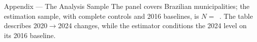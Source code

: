 
\begin{frame}{Appendix --- The Analysis Sample}
\hypertarget{app:sample}{}
\footnotesize
The panel covers \NMunisUniverse{} Brazilian municipalities; the estimation sample, with complete controls and 2016 baselines, is $N=$~\NMunis{}. The table describes 2020$\to$2024 changes, while the estimator conditions the 2024 level on its 2016 baseline.
\vspace{-4pt}
\begin{center}
\scriptsize
\resizebox{\linewidth}{!}{}
\end{center}
\end{frame}
